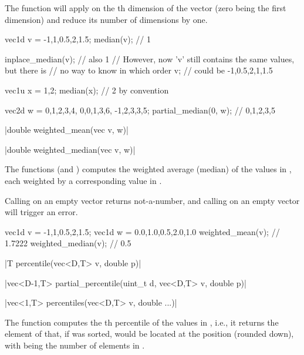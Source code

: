 The function  will apply  on the th dimension of the vector (zero being the first dimension) and reduce its number of dimensions by one.

\begin{example}
\begin{cppcode}
vec1d v = {-1,1,0.5,2,1.5};
median(v); // 1

inplace_median(v); // also 1
// However, now 'v' still contains the same values, but there is
// no way to know in which order
v; // could be {-1,0.5,2,1,1.5}

vec1u x = {1,2};
median(x); // 2 by convention

vec2d w = {{0,1,2,3,4}, {0,0,1,3,6}, {-1,2,3,3,5}};
partial_median(0, w); // {0,1,2,3,5}
\end{cppcode}
\end{example}

\funcitem \cppinline|double weighted_mean(vec v, w)| 

\cppinline|double weighted_median(vec v, w)| 

The functions  (and ) computes the weighted average (median) of the values in , each weighted by a corresponding value in .

Calling  on an empty vector returns not-a-number, and calling  on an empty vector will trigger an error.

\begin{example}
\begin{cppcode}
vec1d v = {-1,1,0.5,2,1.5};
vec1d w = {0.0,1.0,0.5,2.0,1.0}
weighted_mean(v); // 1.7222
weighted_median(v); // 0.5
\end{cppcode}
\end{example}

\funcitem \cppinline|T percentile(vec<D,T> v, double p)| 

\cppinline|vec<D-1,T> partial_percentile(uint_t d, vec<D,T> v, double p)| 

\cppinline|vec<1,T> percentiles(vec<D,T> v, double ...)| 

The function  computes the th percentile of the values in , i.e., it returns the element of  that, if  was sorted, would be located at the position  (rounded down), with  being the number of elements in .

